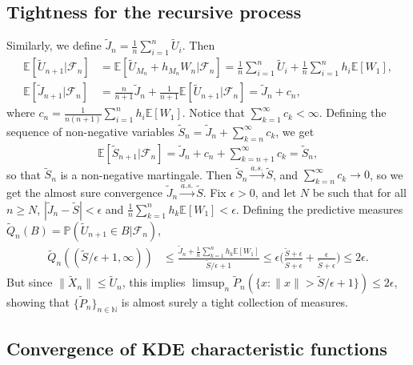 \documentclass[12pt]{article}
\newcommand{\N}{\mathbb{N}}
\newcommand{\E}{\mathbb{E}}
\newcommand{\bP}{\mathbb{P}}
\newcommand{\F}{\mathcal{F}}
\begin{document}
\subsection{Tightness for the recursive process}

Similarly, we define $\tilde{J}_n = \frac{1}{n}\sum_{i = 1}^n \tilde{U}_i$. Then
\begin{align*}
    \E[\tilde{U}_{n+1}| \F_n] &= \E[\tilde{U}_{M_n} + h_{M_n} W_n | \F_n] = \frac{1}{n}\sum_{i = 1}^n \tilde{U}_i + \frac{1}{n}  \sum_{i = 1}^n h_i \E[W_1],\\
    \E[\tilde{J}_{n+1} | \F_n] &= \frac{n}{n+1} \tilde{J}_n + \frac{1}{n+1} \E[\tilde{U}_{n+1} | \F_n] = \tilde{J}_n + c_n,
\end{align*}
where $c_n = \frac{1}{n(n+1)} \sum_{i = 1}^n h_i \E[W_1]$. Notice that $\sum_{k = 1}^\infty c_k < \infty$. Defining the sequence of non-negative variables $\tilde{S}_n = \tilde{J}_n + \sum_{k = n}^\infty c_k$, we get
\begin{align*}
    \E[\tilde{S}_{n+1} | \F_n] = \tilde{J}_n + c_n + \sum_{k = n + 1}^\infty c_k = \tilde{S}_n,
\end{align*}
so that $\tilde{S}_n$ is a non-negative martingale. Then $\tilde{S}_n \overset{a.s.}{\to} \tilde{S}$, and $\sum_{k = n}^\infty c_k \to 0$, so we get the almost sure convergence $\tilde{J}_n \overset{a.s.}{\to} \tilde{S}$.
Fix $\epsilon > 0$, and let $N$ be such that for all $n \geq N$, $|\tilde{J}_n - \tilde{S}| < \epsilon$ and $\frac{1}{n}\sum_{k = 1}^n h_k \E[W_1] < \epsilon$. Defining the predictive measures $\tilde{Q}_n(B) = \bP(\tilde{U}_{n+1} \in B | \F_n)$, 
\begin{align*}
    \tilde{Q}_n((\tilde{S}/\epsilon + 1, \infty))  &\leq \frac{\tilde{J}_n + \frac{1}{n}\sum_{k = 1}^n h_k \E[W_1]}{\tilde{S}/\epsilon + 1} \leq \epsilon\Big(\frac{\tilde{S} + \epsilon}{\tilde{S} + \epsilon} + \frac{\epsilon}{\tilde{S} + \epsilon}\Big) \leq 2\epsilon.
\end{align*}
But since $\|\tilde{X}_n\| \leq \tilde{U}_n$, this implies $\limsup_n \tilde{P}_n(\{ x: \|x\| > \tilde{S}/\epsilon + 1\}) \leq 2\epsilon$, showing that $\{\tilde{P}_n\}_{n \in \N}$ is almost surely a tight collection of measures.

\subsection{Convergence of KDE characteristic functions}
\end{document}
